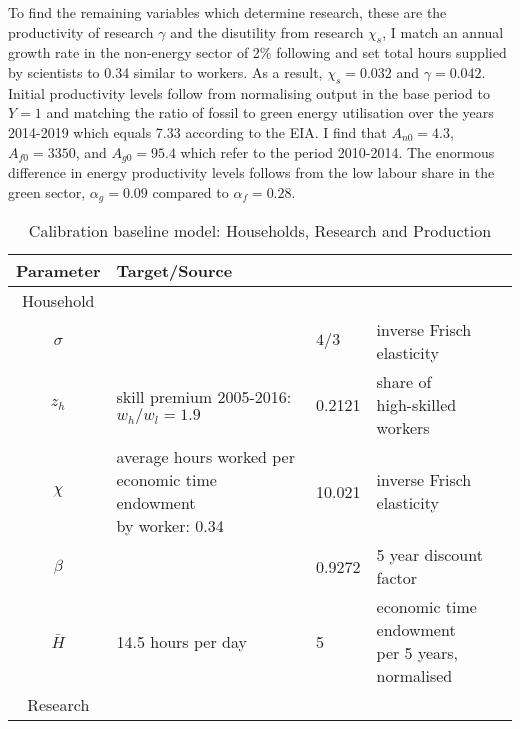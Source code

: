  To find the remaining variables which determine research, these are  the productivity of research $\gamma$ and the disutility from research $\chi_s$, I match an annual growth rate in the non-energy sector of 2\% following \cite{Fried2018ClimateAnalysis} and set total hours supplied by scientists to 0.34 similar to workers. As a result,  $\chi_s=0.032$ and $\gamma=0.042$. Initial productivity levels follow from normalising output in the base period to $Y=1$ and matching the ratio of fossil to green energy utilisation over the years 2014-2019 which equals 7.33 according to the EIA. I find that $A_{n0}=4.3$, $A_{f0}=3350$, and $A_{g0}=95.4$ which refer to the period 2010-2014. The enormous difference in energy productivity levels follows from the low labour share in the green sector, $\alpha_g=0.09$ compared to $\alpha_f= 0.28$. 
 \thispagestyle{empty}
 \begin{table}[h!]
 	\begin{center}
 		\captionsetup{width=0.9\textwidth}
 		\caption{ Calibration baseline model: Households, Research and Production}
 		\label{tab:calib}
 		\begin{tabular}{c|lll}
 			\hline \hline
 			Parameter& Target/Source& \makecell[l]{Calibration}& \makecell[l]{Meaning}\\ 
 			\hline
 			\hline
 			Household&\multicolumn{3}{c}{}\\
 			\hline 
 			
 			\hline
 			$\sigma$ &  \makecell[l]{\cite{Chetty2011AreMargins}}& $4/3$ & inverse Frisch elasticity  \\
 			\hline
 			$z_h$& \makecell[l]{skill premium 2005-2016:\\ $w_h/w_l=1.9$\\ \citep{Slavik2020WagePremium}}&0.2121&\makecell[l]{share of\\ high-skilled workers} \\	
 			\hline			
 			$\chi$ &  \makecell[l]{average hours worked per\\ economic time endowment\\ by worker: 0.34 \cite{OECDHoursworked}}& 10.021 & inverse Frisch elasticity  \\
 			\hline
 			$\beta$ &  \makecell[l]{\cite{Barrage2019OptimalPolicy}}& 0.9272 & 5 year discount factor  \\
 			\hline
 			$\bar{H}$& \makecell[l]{14.5 hours per day\\ \cite{Jones1993OptimalGrowth}}&5&\makecell[l]{economic time endowment \\per 5 years, normalised} \\
 			\hline
 			\hline
 			Research&\multicolumn{3}{c}{}\\
 			\hline
 			

\end{tabular}
\end{center}
\end{table}
